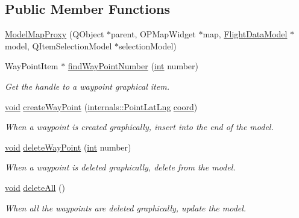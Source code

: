 \subsection*{Public Member Functions}
\begin{DoxyCompactItemize}
\item 
\hyperlink{group___o_p_map_plugin_gaa86a0afe448c45b8ecffde73dff2be16}{Model\-Map\-Proxy} (Q\-Object $\ast$parent, O\-P\-Map\-Widget $\ast$map, \hyperlink{class_flight_data_model}{Flight\-Data\-Model} $\ast$model, Q\-Item\-Selection\-Model $\ast$selection\-Model)
\item 
Way\-Point\-Item $\ast$ \hyperlink{group___o_p_map_plugin_gabc5719db39d81801af2bce5a5dd3eee9}{find\-Way\-Point\-Number} (\hyperlink{ioapi_8h_a787fa3cf048117ba7123753c1e74fcd6}{int} number)
\begin{DoxyCompactList}\small\item\em Get the handle to a waypoint graphical item. \end{DoxyCompactList}\item 
\hyperlink{group___u_a_v_objects_plugin_ga444cf2ff3f0ecbe028adce838d373f5c}{void} \hyperlink{group___o_p_map_plugin_ga4e68125d7b19aa3adf055e50bea8afdf}{create\-Way\-Point} (\hyperlink{structinternals_1_1_point_lat_lng}{internals\-::\-Point\-Lat\-Lng} \hyperlink{glext_8h_a4ad6f000813afde2b5727cbfdddc75be}{coord})
\begin{DoxyCompactList}\small\item\em When a waypoint is created graphically, insert into the end of the model. \end{DoxyCompactList}\item 
\hyperlink{group___u_a_v_objects_plugin_ga444cf2ff3f0ecbe028adce838d373f5c}{void} \hyperlink{group___o_p_map_plugin_ga6e67b9c6c661db0b0c02119c6372c5b7}{delete\-Way\-Point} (\hyperlink{ioapi_8h_a787fa3cf048117ba7123753c1e74fcd6}{int} number)
\begin{DoxyCompactList}\small\item\em When a waypoint is deleted graphically, delete from the model. \end{DoxyCompactList}\item 
\hyperlink{group___u_a_v_objects_plugin_ga444cf2ff3f0ecbe028adce838d373f5c}{void} \hyperlink{group___o_p_map_plugin_gaf33e33d2457fd1ebc593907ffd3c0167}{delete\-All} ()
\begin{DoxyCompactList}\small\item\em When all the waypoints are deleted graphically, update the model. \end{DoxyCompactList}\end{DoxyCompactItemize}


